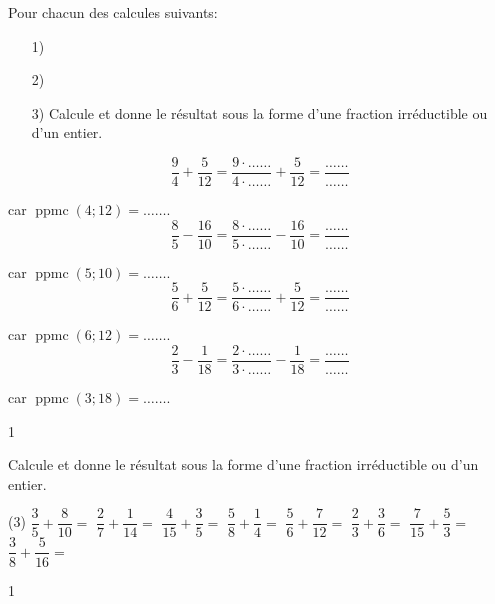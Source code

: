 \documentclass[a4paper,11pt]{report}
\begin{document}
\begin{exop}
{Pour chacun des calcules suivants:
	\begin{enumerate}
    \item[1)] 
    \item[2)] 
    \item[3)] {\text Calcule et donne le résultat sous la forme d'une fraction irréductible ou d'un entier.}
\end{enumerate}
\vspace{5pt}

\begin{tasks}
	\task \[\dfrac{9}{4}+\dfrac{5}{12}=\dfrac{9\cdot\ldots\ldots}{4\cdot\ldots\ldots}+\dfrac{5}{12}=\dfrac{\ldots\ldots}{\ldots\ldots}\]
		\vspace{1pt}

		car $\operatorname{ppmc}(4;12)=\ldots\ldots$. 
	\task \[\dfrac{8}{5}-\dfrac{16}{10}=\dfrac{8\cdot\ldots\ldots}{5\cdot\ldots\ldots}-\dfrac{16}{10}=\dfrac{\ldots\ldots}{\ldots\ldots}\]
		\vspace{1pt}

	car $\operatorname{ppmc}(5;10)=\ldots\ldots$.
	\task \[\dfrac{5}{6}+\dfrac{5}{12}=\dfrac{5\cdot\ldots\ldots}{6\cdot\ldots\ldots}+\dfrac{5}{12}=\dfrac{\ldots\ldots}{\ldots\ldots}\]
		\vspace{1pt}

		car $\operatorname{ppmc}(6;12)=\ldots\ldots$.
	\task \[\dfrac{2}{3}-\dfrac{1}{18}=\dfrac{2\cdot\ldots\ldots}{3\cdot\ldots\ldots}-\dfrac{1}{18}=\dfrac{\ldots\ldots}{\ldots\ldots}\]
		\vspace{1pt}

	car $\operatorname{ppmc}(3;18)=\ldots\ldots$.
\end{tasks}}
{1}
\end{exop}

\begin{exo}
{Calcule et donne le résultat sous la forme d'une fraction irréductible ou d'un entier. 
\begin{tasks}(3)
\task $\dfrac{3}{5}+\dfrac{8}{10}=$
\task $\dfrac{2}{7}+\dfrac{1}{14}=$
\task $\dfrac{4}{15}+\dfrac{3}{5}=$
\task $\dfrac{5}{8}+\dfrac{1}{4}=$
\task $\dfrac{5}{6}+\dfrac{7}{12}=$
\task $\dfrac{2}{3}+\dfrac{3}{6}=$
\task $\dfrac{7}{15}+\dfrac{5}{3}=$
\task $\dfrac{3}{8}+\dfrac{5}{16}=$
\end{tasks}
}{1}
\end{exo}
\end{document}

